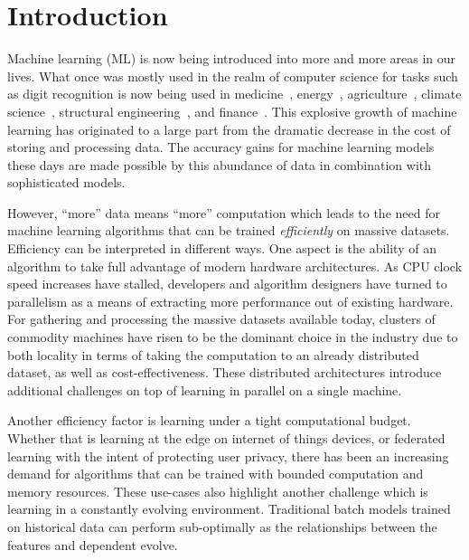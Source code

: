 \chapter{Introduction}

Machine learning (ML) is now being introduced into more and more areas in
our lives. What once was mostly used in the realm of computer science for
tasks such as digit recognition \cite{mnist} is now being used
in medicine~\cite{health-ml-1, health-ml-2}, energy~\cite{ml-building, ml-energy},
agriculture~\cite{ml-agriculture, ml-agriculture-2},
climate science~\cite{ml-climate-science}, structural engineering~\cite{ml-engineering},
and finance~\cite{ml-finance}. This explosive growth of machine learning has originated
to a large part from the dramatic decrease in the cost of storing and processing
data. The accuracy gains for machine learning models these
days are made possible by this abundance of data in combination with sophisticated
models.

However, ``more'' data means ``more'' computation which leads to the need for
machine learning algorithms that can be trained \emph{efficiently} on massive
datasets. Efficiency can be interpreted in different ways. One
aspect is the ability of an algorithm to take full advantage of modern
hardware architectures. As CPU clock speed increases have stalled, developers
and algorithm designers have turned to parallelism as a means of
extracting more performance out of existing hardware.
For gathering and processing the massive datasets available today,
clusters of commodity machines have risen to
be the dominant choice in the industry due to both locality
in terms of taking the computation to an already distributed
dataset, as well as cost-effectiveness. These distributed
architectures introduce additional challenges on top of
learning in parallel on a single machine.

Another efficiency factor
is learning under a tight computational budget. Whether that is
learning at the edge on internet of things devices, or
federated learning with the intent of protecting user privacy, there has
been an increasing demand for algorithms that can be trained
with bounded computation and memory resources.
These use-cases also highlight another challenge which is learning
in a constantly evolving environment. Traditional batch
models trained on historical data can perform sub-optimally as the
relationships between the features and dependent evolve.

